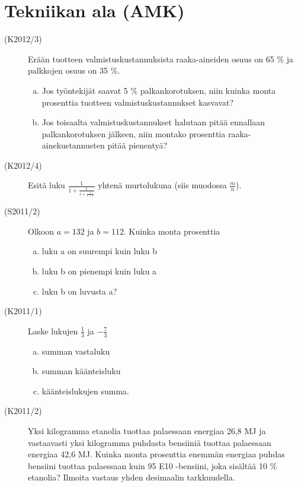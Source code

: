 \section{Tekniikan ala (AMK)}

\begin{description}
	\item[(K2012/3)] Erään tuotteen valmistuskustannuksista raaka-aineiden osuus on 65 \% ja palkkojen osuus on 
35 \%.
	\begin{enumerate}[(a)]
		\item Jos työntekijät saavat 5 \% palkankorotuksen, niin kuinka monta prosenttia tuotteen 
valmistuskustannukset kasvavat?
		\item Jos toisaalta valmistuskustannukset halutaan pitää ennallaan palkankorotuksen 
jälkeen, niin montako prosenttia raaka-ainekustannusten pitää pienentyä?
	\end{enumerate}	 

	\item[(K2012/4)] Esitä luku $\frac{1}{1+\frac{1}{1+\frac{1}{1+1}}}$ yhtenä murtolukuna (siis muodossa $\frac{m}{n}$).
	\item[(S2011/2)] Olkoon $a=132$ ja  $b=112$. Kuinka monta prosenttia 
		\begin{enumerate}[(a)]
			\item luku a on suurempi kuin luku b
			\item luku b on pienempi kuin luku a
			\item luku b on luvusta a? 
		\end{enumerate}
	\item[(K2011/1)] Laske lukujen $\frac{1}{3}$ ja $-\frac{7}{3}$
		\begin{enumerate}[(a)]
			\item summan vastaluku
			\item summan käänteisluku 
			\item käänteislukujen summa.
		\end{enumerate}
	\item[(K2011/2)] Yksi kilogramma etanolia tuottaa palaessaan energiaa 26,8 MJ ja vastaavasti yksi kilogramma puhdasta bensiiniä tuottaa palaessaan energiaa 42,6 MJ. Kuinka monta prosenttia 
enemmän energiaa puhdas bensiini tuottaa palaessaan kuin  
95 E10 -bensiini, joka sisältää 10 \% etanolia? Ilmoita vastaus yhden desimaalin tarkkuudella. 
\end{description}


